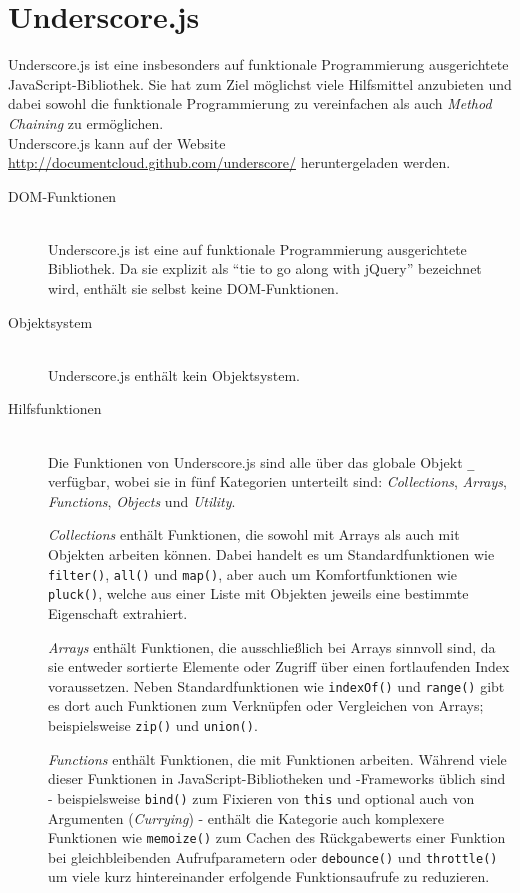 \section{Underscore.js}
Underscore.js ist eine insbesonders auf funktionale Programmierung ausgerichtete
JavaScript-Bibliothek. Sie hat zum Ziel möglichst viele Hilfsmittel anzubieten und dabei sowohl die
funktionale  Programmierung zu vereinfachen als auch \emph{Method Chaining} zu ermöglichen. \\
Underscore.js kann auf der Website
\href{http://documentcloud.github.com/underscore/}{http://documentcloud.github.com/underscore/}
heruntergeladen werden.

\begin{description}
\item[DOM-Funktionen] \hfill \\
Underscore.js ist eine auf funktionale Programmierung ausgerichtete Bibliothek. Da sie explizit als
\enquote{tie to go along with jQuery} bezeichnet wird, enthält sie selbst keine DOM-Funktionen.

\item[Objektsystem] \hfill \\
Underscore.js enthält kein Objektsystem.

\item[Hilfsfunktionen] \hfill \\
Die Funktionen von Underscore.js sind alle über das globale Objekt \lstinline{_} verfügbar, wobei
sie in fünf Kategorien unterteilt sind: \emph{Collections}, \emph{Arrays}, \emph{Functions},
\emph{Objects} und \emph{Utility}.

\emph{Collections} enthält Funktionen, die sowohl mit Arrays als auch mit Objekten arbeiten können.
Dabei handelt es um Standardfunktionen wie \lstinline{filter()}, \lstinline{all()} und
\lstinline{map()}, aber auch um Komfortfunktionen wie \lstinline{pluck()}, welche aus einer Liste mit
Objekten jeweils eine bestimmte Eigenschaft extrahiert.

\emph{Arrays} enthält Funktionen, die ausschließlich bei Arrays sinnvoll sind, da sie entweder
sortierte Elemente oder Zugriff über einen fortlaufenden Index voraussetzen. Neben
Standardfunktionen wie \lstinline{indexOf()} und \lstinline{range()} gibt es dort auch Funktionen
zum Verknüpfen oder Vergleichen von Arrays; beispielsweise \lstinline{zip()} und
\lstinline{union()}.

\emph{Functions} enthält Funktionen, die mit Funktionen arbeiten. Während viele dieser Funktionen in
JavaScript-Bibliotheken und -Frameworks üblich sind - beispielsweise \lstinline{bind()} zum Fixieren
von \lstinline{this} und optional auch von Argumenten (\emph{Currying}) - enthält die Kategorie auch
komplexere Funktionen wie \lstinline{memoize()} zum Cachen des Rückgabewerts einer Funktion bei
gleichbleibenden Aufrufparametern oder \lstinline{debounce()} und \lstinline{throttle()} um viele
kurz hintereinander erfolgende Funktionsaufrufe zu reduzieren.


\end{description}
